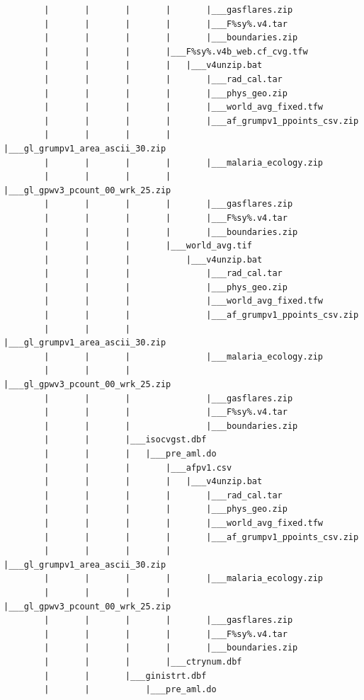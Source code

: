 \documentclass[]{book}
\begin{document}
\begin{verbatim}
        |       |       |       |       |___gasflares.zip
        |       |       |       |       |___F%sy%.v4.tar
        |       |       |       |       |___boundaries.zip
        |       |       |       |___F%sy%.v4b_web.cf_cvg.tfw
        |       |       |       |   |___v4unzip.bat
        |       |       |       |       |___rad_cal.tar
        |       |       |       |       |___phys_geo.zip
        |       |       |       |       |___world_avg_fixed.tfw
        |       |       |       |       |___af_grumpv1_ppoints_csv.zip
        |       |       |       |       |___gl_grumpv1_area_ascii_30.zip
        |       |       |       |       |___malaria_ecology.zip
        |       |       |       |       |___gl_gpwv3_pcount_00_wrk_25.zip
        |       |       |       |       |___gasflares.zip
        |       |       |       |       |___F%sy%.v4.tar
        |       |       |       |       |___boundaries.zip
        |       |       |       |___world_avg.tif
        |       |       |           |___v4unzip.bat
        |       |       |               |___rad_cal.tar
        |       |       |               |___phys_geo.zip
        |       |       |               |___world_avg_fixed.tfw
        |       |       |               |___af_grumpv1_ppoints_csv.zip
        |       |       |               |___gl_grumpv1_area_ascii_30.zip
        |       |       |               |___malaria_ecology.zip
        |       |       |               |___gl_gpwv3_pcount_00_wrk_25.zip
        |       |       |               |___gasflares.zip
        |       |       |               |___F%sy%.v4.tar
        |       |       |               |___boundaries.zip
        |       |       |___isocvgst.dbf
        |       |       |   |___pre_aml.do
        |       |       |       |___afpv1.csv
        |       |       |       |   |___v4unzip.bat
        |       |       |       |       |___rad_cal.tar
        |       |       |       |       |___phys_geo.zip
        |       |       |       |       |___world_avg_fixed.tfw
        |       |       |       |       |___af_grumpv1_ppoints_csv.zip
        |       |       |       |       |___gl_grumpv1_area_ascii_30.zip
        |       |       |       |       |___malaria_ecology.zip
        |       |       |       |       |___gl_gpwv3_pcount_00_wrk_25.zip
        |       |       |       |       |___gasflares.zip
        |       |       |       |       |___F%sy%.v4.tar
        |       |       |       |       |___boundaries.zip
        |       |       |       |___ctrynum.dbf
        |       |       |___ginistrt.dbf
        |       |           |___pre_aml.do

\end{verbatim}
\end{document}
